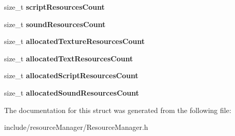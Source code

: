 \begin{DoxyCompactItemize}
size\+\_\+t {\bfseries script\+Resources\+Count}
\item 
\hypertarget{struct_resource_manager_ab954cc6c43743c2c3826407b6ada7b20}{}\label{struct_resource_manager_ab954cc6c43743c2c3826407b6ada7b20} 
size\+\_\+t {\bfseries sound\+Resources\+Count}
\item 
\hypertarget{struct_resource_manager_a4473def59a0338584d4d4c466105db47}{}\label{struct_resource_manager_a4473def59a0338584d4d4c466105db47} 
size\+\_\+t {\bfseries allocated\+Texture\+Resources\+Count}
\item 
\hypertarget{struct_resource_manager_ae61b0771d13aaa72c035c5d306578b7d}{}\label{struct_resource_manager_ae61b0771d13aaa72c035c5d306578b7d} 
size\+\_\+t {\bfseries allocated\+Text\+Resources\+Count}
\item 
\hypertarget{struct_resource_manager_a6f8a119859b5b46cd03ebffbe4385c87}{}\label{struct_resource_manager_a6f8a119859b5b46cd03ebffbe4385c87} 
size\+\_\+t {\bfseries allocated\+Script\+Resources\+Count}
\item 
\hypertarget{struct_resource_manager_a0b32bb32a73ee0fac79dee341bbb91c3}{}\label{struct_resource_manager_a0b32bb32a73ee0fac79dee341bbb91c3} 
size\+\_\+t {\bfseries allocated\+Sound\+Resources\+Count}
\end{DoxyCompactItemize}


The documentation for this struct was generated from the following file\+:\begin{DoxyCompactItemize}
\item 
include/resource\+Manager/Resource\+Manager.\+h\end{DoxyCompactItemize}
